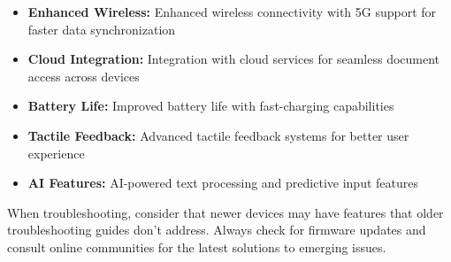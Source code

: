 \begin{itemize}
	\item \textbf{Enhanced Wireless:} Enhanced wireless connectivity with 5G support for faster data synchronization
	\item \textbf{Cloud Integration:} Integration with cloud services for seamless document access across devices
	\item \textbf{Battery Life:} Improved battery life with fast-charging capabilities
	\item \textbf{Tactile Feedback:} Advanced tactile feedback systems for better user experience
	\item \textbf{AI Features:} AI-powered text processing and predictive input features
\end{itemize}

\begin{raggedright}
	When troubleshooting, consider that newer devices may have features that older troubleshooting guides don't address. Always check for firmware updates and consult online communities for the latest solutions to emerging issues.
\end{raggedright}
